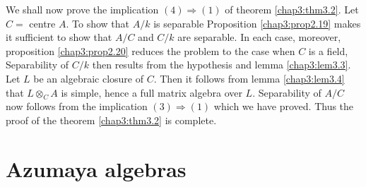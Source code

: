     We shall now prove the implication $(4) \Rightarrow (1)$ of
    theorem \ref{chap3:thm3.2}. Let $C=$ centre $A$. To show that
    $A/k$ is separable 
    Proposition \ref{chap3:prop2.19} makes it sufficient to show that
    $A/C$ and $C/k$ 
    are separable. In each case, moreover, proposition
    \ref{chap3:prop2.20} reduces 
    the problem to the case when $C$ is a field, Separability of
    $C/k$ then results from the hypothesis and lemma
    \ref{chap3:lem3.3}. Let $L$ be 
    an algebraic closure of $C$. Then it follows from lemma
    \ref{chap3:lem3.4} that 
    $L \otimes_C A$ is simple, hence a full matrix algebra over
    $L$. Separability of $A/C$ now follows from the implication $(3)
    \Rightarrow (1)$ which we have proved. Thus the proof of  the
    theorem \ref{chap3:thm3.2} is complete. 

  \section{Azumaya algebras}\label{chap3:sec4} %

